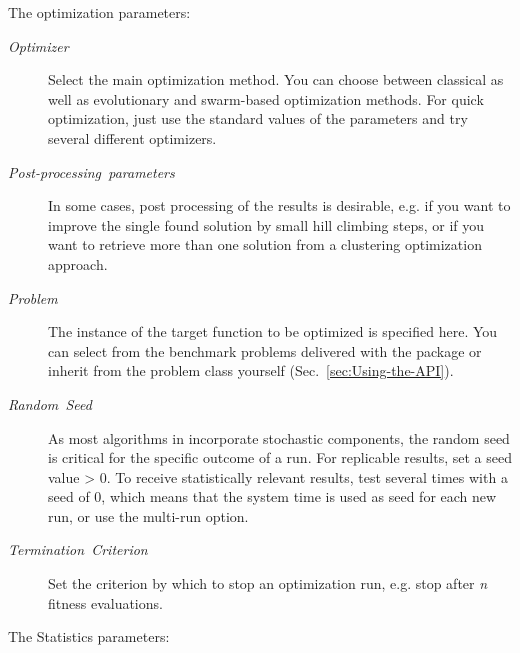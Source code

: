 The optimization parameters:
\begin{description}
\item [{\textit{Optimizer}}] Select the main optimization method. You can
choose between classical as well as evolutionary and swarm-based optimization
methods. For quick optimization, just use the standard values of the
parameters and try several different optimizers.
\item [{\textit{Post-processing~parameters}}] In some cases, post processing
of the results is desirable, e.g. if you want to improve the single
found solution by small hill climbing steps, or if you want to retrieve
more than one solution from a clustering optimization approach.
\item [{\textit{Problem}}] The instance of the target function to be optimized
is specified here. You can select from the benchmark problems delivered
with the package or inherit from the problem class yourself (Sec.~\ref{sec:Using-the-API}).
\item [{\textit{Random~Seed}}] As most algorithms in  incorporate
stochastic components, the random seed is critical for the specific
outcome of a run. For replicable results, set a seed value > 0. To
receive statistically relevant results, test several times with a
seed of 0, which means that the system time is used as seed for each
new run, or use the multi-run option.
\item [{\textit{Termination~Criterion}}] Set the criterion by which to
stop an optimization run, e.g. stop after \emph{n} fitness evaluations.
\end{description}
The Statistics parameters:

